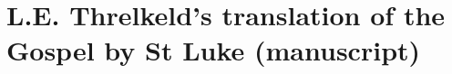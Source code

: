 \part{L.E. Threlkeld's translation of the Gospel by St Luke (manuscript)}
\label{sec:Section_3}



\newpage
